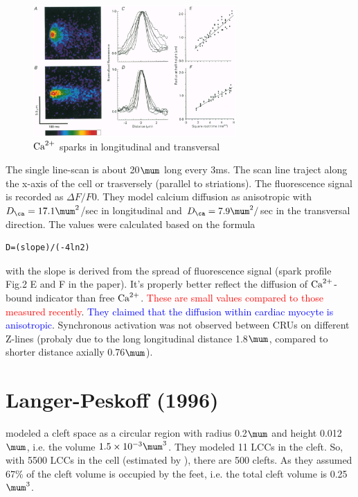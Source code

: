 \begin{figure}[hbt]
  \centerline{\includegraphics[height=5cm,
    angle=0]{./images/spark_parker1996_2.eps}}
  \caption{${\text{Ca}^{2+}}$ sparks in longitudinal and transversal}
  \label{fig:spark_parker1996_2}
\end{figure}

The single line-scan is about 20$\mum$ long every 3ms. The scan line traject
along the x-axis of the cell or trasversely (parallel to striations). The
fluorescence signal is recorded as $\Delta F/F0$. They model calcium diffusion
as anisotropic with $D_\ca = 17.1\mum^2$/sec in longitudinal and $D_\ca =
7.9\mum^2/$sec in the transversal direction. The values were calculated based on
the formula
\begin{verbatim}
D=(slope)/(-4ln2)
\end{verbatim}
with the slope is derived from the spread of fluorescence signal
(spark profile Fig.2 E and F in the paper). It's properly better reflect the
diffusion of ${\text{Ca}^{2+}}$-bound indicator than free ${\text{Ca}^{2+}}$. \textcolor{red}{These are
small values compared to those measured recently}. \textcolor{blue}{They
claimed that the diffusion within cardiac myocyte is anisotropic}. Synchronous
activation was not observed between CRUs on different Z-lines (probaly due to
the long longitudinal distance 1.8$\mum$, compared to shorter distance axially
0.76$\mum$).  

\section{Langer-Peskoff (1996)}
\label{sec:Langer-Peskoff_96}

\citep{langer1996} modeled a cleft space as a circular region with radius
0.2$\mum$ and height 0.012 $\mum$, i.e. the volume $1.5\times 10^{-3}\mum^3$.
They modeled 11 LCCs in the cleft. So, with 5500 LCCs in the cell (estimated by
\citep{isenberg1995}), there are 500 clefts. As they assumed 67\% of the cleft
volume is occupied by the feet, i.e. the total cleft volume is
0.25$\mum^3$.

